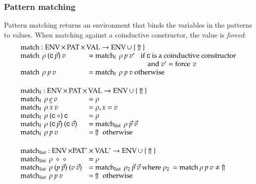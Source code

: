 \subsubsection{Pattern matching}
Pattern matching returns an environment that binds the variables in the patterns to values.
When matching against a coinductive constructor, the value is \emph{forced}:
\[
\begin{array}{ll}
\multicolumn{2}{l}{\match : \Env \times \Pat \times \Val \ra \Env \cup \: \{ \: \stuck \: \} }\\
\match \: \rho \: (\cc \: \vec{p}) \: v & = \matchf \: \rho \: p \: v' \spc \mbox{if  } \cc  \mbox{ is a coinductive constructor}\\
& \spcx \spcx \spcx \mbox{and } v' = \forc \: v \\
\match \: \rho \: p \: v & = \matchf \: \rho \: p \: v \mbox{ otherwise}\\
\vs\\
\multicolumn{2}{l}{\matchf : \Env \times \Pat \times \Val \ra \Env \cup \: \{ \: \stuck \: \} }\\
\matchf \: \rho \: \inacc{e} \: v & = \rho \\
\matchf \: \rho \: x \: v & = \ins{\rho}{x}{v} \\
\matchf \: \rho \: (\cc \: \diamond) \: \cc & = \rho \\
\matchf \: \rho \: (\cc \: \vec{p}) \: (\cc \: \vec{v}) & = \matchList \: \rho \: \vec{p} \: \vec{v} \\
\matchf \: \rho \: p \: v & = \: \stuck \mbox{ otherwise}\\
\vs\\
\multicolumn{2}{l}{\matchList : \Env \times \ves{\Pat} \times \ves{\Val} \ra \Env \cup \: \{ \: \stuck \: \} }\\
\matchList \: \rho \: \diamond \: \diamond & = \rho \\
\matchList \: \rho \: (p \: \vec{p}) \: (v \: \vec{v}) & = \matchList \: \rho_2 \: \vec{p} \: \vec{v} \mbox{ where } \rho_2 \: = \match \rho \: p \: v \neq \: \stuck \\
\matchList \: \rho \: p \: v & = \: \stuck \mbox { otherwise } \\
\end{array}
\]

